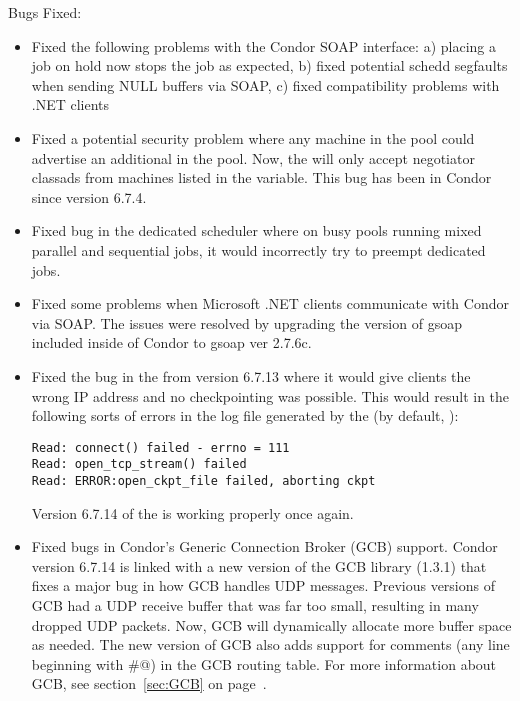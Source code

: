 \noindent Bugs Fixed:

\begin{itemize}

\item Fixed the following problems with the Condor SOAP interface: a) placing a
job on hold now stops the job as expected, b) fixed potential schedd segfaults
when sending NULL buffers via SOAP, c) fixed compatibility problems with .NET
clients

\item Fixed a potential security problem where any machine in the pool
  could advertise an additional  in the pool.
  Now, the  will only accept negotiator classads
  from machines listed in the  variable.
  This bug has been in Condor since version 6.7.4.

\item Fixed bug in the dedicated scheduler where on busy pools
running mixed parallel and sequential jobs, it would incorrectly 
try to preempt dedicated jobs.

\item Fixed some problems when Microsoft .NET clients communicate with Condor
via SOAP. The issues were resolved by upgrading the version of gsoap included
inside of Condor to gsoap ver 2.7.6c.

\item Fixed the bug in the  from version 6.7.13
  where it would give clients the wrong IP address and no
  checkpointing was possible.
  This would result in the following sorts of errors in the log file
  generated by the  (by default, ):
\footnotesize
\begin{verbatim}
Read: connect() failed - errno = 111
Read: open_tcp_stream() failed
Read: ERROR:open_ckpt_file failed, aborting ckpt
\end{verbatim}
\normalsize
  Version 6.7.14 of the  is working properly once
  again. 

\item Fixed bugs in Condor's Generic Connection Broker (GCB) support.
  Condor version 6.7.14 is linked with a new version of the GCB
  library (1.3.1) that fixes a major bug in how GCB handles UDP
  messages.
  Previous versions of GCB had a UDP receive buffer that was far too
  small, resulting in many dropped UDP packets.
  Now, GCB will dynamically allocate more buffer space as needed.
  The new version of GCB also adds support for comments (any line
  beginning with \verb@#@) in the GCB routing table.
  For more information about GCB, see section~\ref{sec:GCB} on
  page~\pageref{sec:GCB}. 


\end{itemize}
